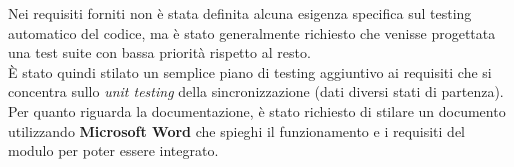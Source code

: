 \documentclass[\main/tesi.tex]{subfiles}
\begin{document}
Nei requisiti forniti non è stata definita alcuna esigenza specifica sul testing automatico del codice, ma è stato generalmente richiesto che venisse progettata una test suite con bassa priorità rispetto al resto.\\
È stato quindi stilato un semplice piano di testing aggiuntivo ai requisiti che si concentra sullo \textit{unit testing} della sincronizzazione (dati diversi stati di partenza).\\

Per quanto riguarda la documentazione, è stato richiesto di stilare un documento utilizzando \textbf{Microsoft Word} che spieghi il funzionamento e i requisiti del modulo per poter essere integrato.\\
\end{document}
